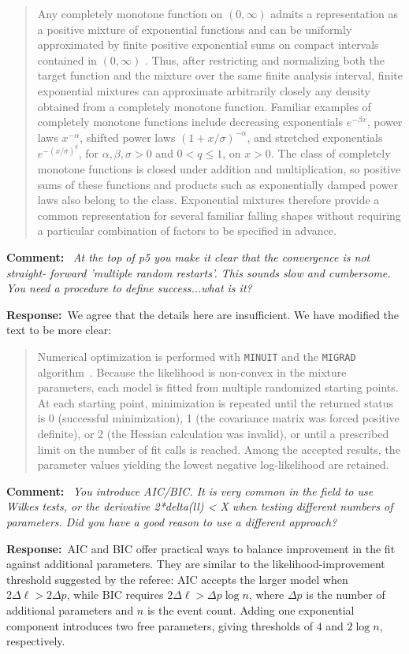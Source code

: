 \documentclass[11pt,a4paper]{article}
\newcommand{\refcomment}[1]{%
    \medskip\noindent\textbf{\color{refcolor}Comment:}\ %
    {\itshape #1}\par\smallskip
}
\newcommand{\response}{\noindent\textbf{Response:}\ }
\newcommand{\addedtext}[1]{%
    \smallskip\begin{quote}\color{quotecolor}\small #1\end{quote}\smallskip
}
\begin{document}
\addedtext{Any completely monotone function on $(0,\infty)$ admits a representation as a positive mixture of exponential functions \cite{bernstein} and can be uniformly approximated by finite positive exponential sums on compact intervals contained in $(0,\infty)$ \cite{McGlinn_1978}. Thus, after restricting and normalizing both the target function and the mixture over the same finite analysis interval, finite exponential mixtures can approximate arbitrarily closely any density obtained from a completely monotone function. Familiar examples of completely monotone functions include decreasing exponentials $e^{-\beta x}$, power laws $x^{-\alpha}$, shifted power laws $(1+x/\sigma)^{-\alpha}$, and stretched exponentials $e^{-(x/\sigma)^q}$, for $\alpha,\beta,\sigma>0$ and $0<q\leq1$, on $x>0$. The class of completely monotone functions is closed under addition and multiplication, so positive sums of these functions and products such as exponentially damped power laws also belong to the class. Exponential mixtures therefore provide a common representation for several familiar falling shapes without requiring a particular combination of factors to be specified in advance.}

\refcomment{At the top of p5 you make it clear that the convergence is not straight-
forward ’multiple random restarts’. This sounds slow and cumbersome. You need a procedure to define success...what is it?}
\response We agree that the details here are insufficient. We have modified the text to be more clear:
\addedtext{Numerical optimization is performed with \texttt{MINUIT} and the \texttt{MIGRAD} algorithm~\cite{Minuit2}. Because the likelihood is non-convex in the mixture parameters, each model is fitted from multiple randomized starting points. At each starting point, minimization is repeated until the returned status is 0 (successful minimization), 1 (the covariance matrix was forced positive definite), or 2 (the Hessian calculation was invalid), or until a prescribed limit on the number of fit calls is reached. Among the accepted results, the parameter values yielding the lowest negative log-likelihood are retained.
}

\refcomment{You introduce AIC/BIC. It is very common in the field to use Wilkes tests, or the derivative 2*delta(ll) < X when testing different numbers of parameters. Did you have a good reason to use a different approach?}
\response AIC and BIC offer practical ways to balance improvement in the fit against additional parameters. They are similar to the likelihood-improvement threshold suggested by the referee: AIC accepts the larger model when $2\Delta\ell>2\Delta p$, while BIC requires $2\Delta\ell>\Delta p\log n$, where $\Delta p$ is the number of additional parameters and $n$ is the event count. Adding one exponential component introduces two free parameters, giving thresholds of $4$ and $2\log n$, respectively.
\end{document}
